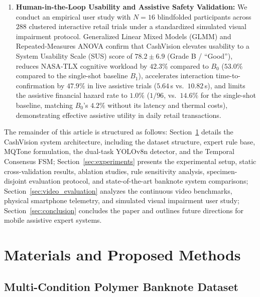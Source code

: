 \documentclass[final,5p,times,twocolumn,authoryear]{elsarticle}
\begin{document}
\begin{enumerate}[label=\textbf{(C\arabic*)}]
    \item \textbf{Human-in-the-Loop Usability and Assistive Safety Validation:} We conduct an empirical user study with $N=16$ blindfolded participants across $288$ clustered interactive retail trials under a standardized simulated visual impairment protocol. Generalized Linear Mixed Models (GLMM) and Repeated-Measures ANOVA confirm that CashVision elevates usability to a System Usability Scale (SUS) score of $78.2 \pm 6.9$ (Grade B / ``Good''), reduces NASA-TLX cognitive workload by $42.3\%$ compared to $B_0$ ($53.0\%$ compared to the single-shot baseline $B_1$), accelerates interaction time-to-confirmation by $47.9\%$ in live assistive trials ($5.64$\,s vs.\ $10.82$\,s), and limits the assistive financial hazard rate to $1.0\%$ ($1/96$, vs.\ $14.6\%$ for the single-shot baseline, matching $B_0$'s $4.2\%$ without its latency and thermal costs), demonstrating effective assistive utility in daily retail transactions.
\end{enumerate}

The remainder of this article is structured as follows: Section~\ref{sec:methodology} details the CashVision system architecture, including the dataset structure, expert rule base, MQTone formulation, the dual-task YOLOv8n detector, and the Temporal Consensus FSM; Section~\ref{sec:experiments} presents the experimental setup, static cross-validation results, ablation studies, rule sensitivity analysis, specimen-disjoint evaluation protocol, and state-of-the-art banknote system comparisons; Section~\ref{sec:video_evaluation} analyzes the continuous video benchmarks, physical smartphone telemetry, and simulated visual impairment user study; Section~\ref{sec:conclusion} concludes the paper and outlines future directions for mobile assistive expert systems.

\section{Materials and Proposed Methods}
\label{sec:methodology}

\subsection{Multi-Condition Polymer Banknote Dataset}
\label{subsec:dataset}
\end{document}
